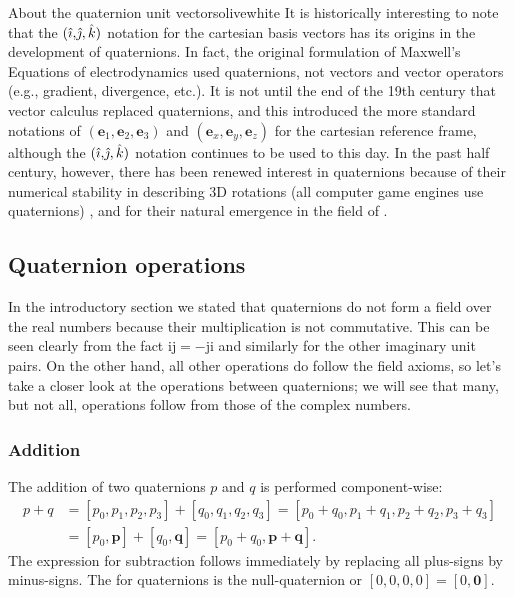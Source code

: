 \begin{messagebox}{About the quaternion unit vectors}{olive}{\icinfo}{white}
It is historically interesting to note that the  $(\hat{\mathrm{\imath}}, \hat{\mkern-3mu\mathrm{\jmath}}, \hat{k})$ notation for the cartesian basis vectors has its origins in the development of quaternions.  In fact, the original formulation of Maxwell's Equations of electrodynamics used quaternions, not vectors and vector operators (e.g., gradient, divergence, etc.).  It is not until the end of the 19th century that vector calculus replaced quaternions, and this introduced the more standard notations of $(\mathbf{e}_1,\mathbf{e}_2,\mathbf{e}_3)$ and  $(\mathbf{e}_x,\mathbf{e}_y,\mathbf{e}_z)$ for the cartesian reference frame, although the $(\hat{\mathrm{\imath}}, \hat{\mkern-3mu\mathrm{\jmath}}, \hat{k})$ notation continues to be used to this day.  In the past half century, however, there has been renewed interest in quaternions because of their numerical stability  in describing 3D rotations (all computer game engines use quaternions) \cite{hanson2005a}, and for their natural emergence in the field of  \cite{hestenes1984a}.
\end{messagebox}


\subsection{Quaternion operations}
In the introductory section we stated that quaternions do not form a field over the real numbers because their multiplication is not commutative.  This can be seen clearly from the fact $\mathrm{i}\mathrm{j}=-\mathrm{j}\mathrm{i}$ and similarly for the other imaginary unit pairs.  On the other hand, all other operations do follow the field axioms, so let's take a closer look at the operations between quaternions; we will see that many, but not all, operations follow from those of the complex numbers.

\subsubsection{Addition}
The addition of two quaternions $p$ and $q$ is performed component-wise:
\begin{equation}
\begin{split}
	p+q &= [p_0,p_1,p_2,p_3]+[q_0,q_1,q_2,q_3]=[p_0+q_0,p_1+q_1,p_2+q_2,p_3+q_3]\\
	 &= [p_0,\mathbf{p}]+[q_0,\mathbf{q}]= [p_0+q_0,\mathbf{p}+\mathbf{q}].
\end{split}
\end{equation}
The expression for subtraction follows immediately by replacing all plus-signs by minus-signs.  The  for quaternions is the null-quaternion or $[0,0,0,0]=[0,\mathbf{0}]$.

